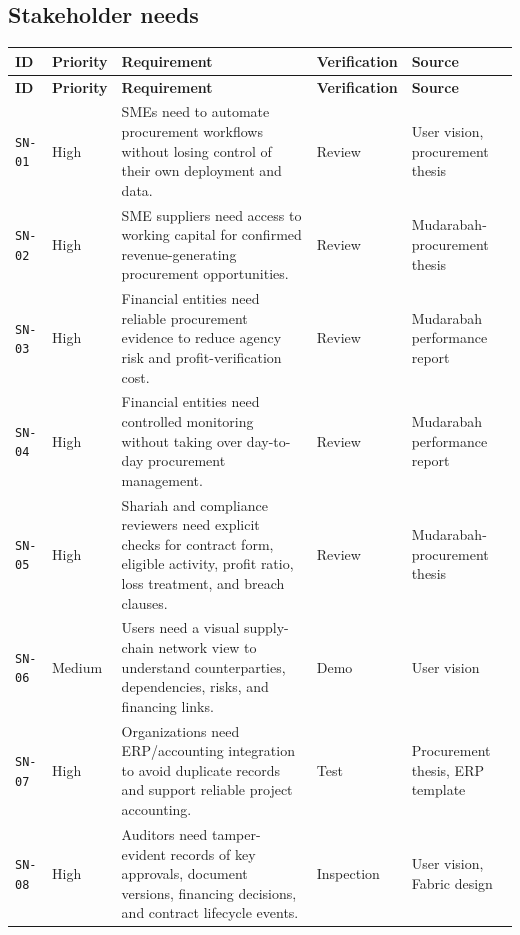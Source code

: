 \documentclass[11pt,a4paper]{article}
\begin{document}
\subsection{Stakeholder needs}\label{sec:stakeholder-needs}
\begin{footnotesize}
\begin{longtable}{@{}p{}p{}p{}p{}p{}@{}}
\rowcolor{gray!18}\textbf{ID} & \textbf{Priority} & \textbf{Requirement} & \textbf{Verification} & \textbf{Source} \\ \hline
\endfirsthead
\rowcolor{gray!18}\textbf{ID} & \textbf{Priority} & \textbf{Requirement} & \textbf{Verification} & \textbf{Source} \\ \hline
\endhead
\texttt{SN-01} & High & SMEs need to automate procurement workflows without losing control of their own deployment and data. & Review & User vision, procurement thesis \\ \hline
\texttt{SN-02} & High & SME suppliers need access to working capital for confirmed revenue-generating procurement opportunities. & Review & Mudarabah-procurement thesis \\ \hline
\texttt{SN-03} & High & Financial entities need reliable procurement evidence to reduce agency risk and profit-verification cost. & Review & Mudarabah performance report \\ \hline
\texttt{SN-04} & High & Financial entities need controlled monitoring without taking over day-to-day procurement management. & Review & Mudarabah performance report \\ \hline
\texttt{SN-05} & High & Shariah and compliance reviewers need explicit checks for contract form, eligible activity, profit ratio, loss treatment, and breach clauses. & Review & Mudarabah-procurement thesis \\ \hline
\texttt{SN-06} & Medium & Users need a visual supply-chain network view to understand counterparties, dependencies, risks, and financing links. & Demo & User vision \\ \hline
\texttt{SN-07} & High & Organizations need ERP/accounting integration to avoid duplicate records and support reliable project accounting. & Test & Procurement thesis, ERP template \\ \hline
\texttt{SN-08} & High & Auditors need tamper-evident records of key approvals, document versions, financing decisions, and contract lifecycle events. & Inspection & User vision, Fabric design \\ \hline

\end{longtable}
\end{footnotesize}
\end{document}
